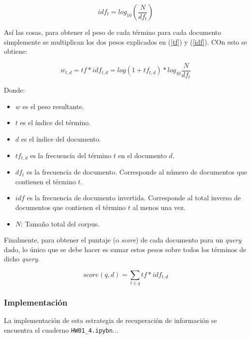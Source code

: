 \begin{equation}
    idf_t = log_{10} \left(\frac{N}{df_t}\right)
    \label{idf}
\end{equation}

Así las cosas, para obtener el peso de cada término para cada documento simplemente se multiplican los dos pesos explicados en (\ref{tf}) y (\ref{idf}). COn esto se obtiene: 

\begin{equation}
    w_{t,d} = tf * idf_{t,d} = log(1 + tf_{t,d}) * log_{10}\frac{N}{df_t}
    \label{eq:tfidf}
\end{equation}

Donde:
\begin{itemize}
    \item $w$ es el peso resultante.
    \item $t$ es el índice del término.
    \item $d$ es el índice del documento.
    \item $tf_{t,d}$ es la frecuencia del término $t$ en el documento $d$.
    \item $df_{t}$ es la frecuencia de documento. Corresponde al número de documentos que contienen el término $t$. 
    \item $idf$ es la frecuencia de documento invertida. Corresponde al total inverso de documentos que contienen el término $t$ al menos una vez.
    \item $N$: Tamaño total del corpus.
\end{itemize}

Finalmente, para obtener el puntaje (o \textit{score}) de cada documento para un \textit{query} dado, lo único que se debe hacer es sumar estos pesos sobre todos los términos de dicho \textit{query}.

\begin{equation}
    score(q,d) = \sum_{t\in q} tf * idf_{t,d}
\end{equation}

\subsubsection{Implementación}

La implementación de esta estrategia de recuperación de información se encuentra el cuaderno \texttt{HW01\_4.ipybn}...